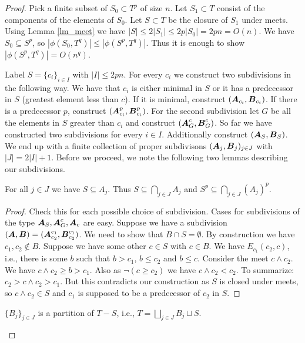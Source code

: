 \begin{proof}
  Pick a finite subset of $S_0 \subset T^p$ of size $n$. Let $S_1 \subset T$ consist of the components of the elements of $S_0$. Let $S \subset T$ be the closure of $S_1$ under meets. Using Lemma \ref{lm_meet} we have $|S| \leq 2|S_1| \leq 2p|S_0| = 2pn = O(n)$. We have $S_0 \subseteq S^p$, so $|\phi(S_0, T^q)| \leq |\phi(S^p, T^q)|$. Thus it is enough to show $|\phi(S^p, T^q)| = O(n^q)$.
  
  Label $S = \{c_i\}_{i \in I}$ with $|I| \leq 2pn$. For every $c_i$ we construct two subdivisions in the following way. We have that $c_i$ is either minimal in $S$ or it has a predecessor in $S$ (greatest element less than $c$). If it is minimal, construct $(\operatorname{\boldsymbol A}_{c_i}, \operatorname{\boldsymbol B}_{c_i})$. If there is a predecessor $p$, construct $(\operatorname{\boldsymbol A}^p_{c_i}, \operatorname{\boldsymbol B}^p_{c_i})$. For the second subdivision let $G$ be all the elements in $S$ greater than $c_i$ and construct $(\operatorname{\boldsymbol A}^c_G, \operatorname{\boldsymbol B}^c_G)$. So far we have constructed two subdivisions for every $i \in I$. Additionally construct $(\operatorname{\boldsymbol A}_S, \operatorname{\boldsymbol B}_S)$. We end up with a finite collection of proper subdivisons $(\operatorname{\boldsymbol A}_j, \operatorname{\boldsymbol B}_j)_{j \in J}$ with $|J| = 2|I| + 1$. Before we proceed, we note the following two lemmas describing our subdivisions.
  
  \begin{Lemma}
    For all $j \in J$ we have $S \subseteq A_j$. Thus $S \subseteq \bigcap_{j \in J} A_j$ and $S^p \subseteq \bigcap_{j \in J} (A_j)^p$. 
  \end{Lemma}
  
  \begin{proof}
    Check this for each possible choice of subdivision. Cases for subdivisions of the type $\operatorname{\boldsymbol A}_S, \operatorname{\boldsymbol A}^c_G, \operatorname{\boldsymbol A}_c$ are easy.
    Suppose we have a subdivision $(\operatorname{\boldsymbol A}, \operatorname{\boldsymbol B}) = (\operatorname{\boldsymbol A}^{c_1}_{c_2}, \operatorname{\boldsymbol B}^{c_1}_{c_2})$.
    We need to show that $B \cap S = \emptyset$.
    By construction we have $c_1, c_2 \notin B$.
    Suppose we have some other $c \in S$ with $c \in B$.
    We have $E_{c_1}(c_2, c)$, i.e., there is some $b$ such that $b > c_1$, $b \leq c_2$ and $b \leq c$.
    Consider the meet $c \wedge c_2$.
    We have $c \wedge c_2 \geq b > c_1$.
    Also as $\neg (c \geq c_2)$ we have $c \wedge c_2 < c_2$.
    To summarize: $c_2 > c \wedge c_2 > c_1$.
    But this contradicts our construction as $S$ is closed under meets,
    so $c \wedge c_2 \in S$ and $c_1$ is supposed to be a predecessor of $c_2$ in $S$.
  \end{proof}
  
  \begin{Lemma}
    $\{B_j\}_{j \in J}$ is a partition of $T - S$, i.e., $T = \bigsqcup_{j \in J} B_j \sqcup S$.
  \end{Lemma}
  

\end{proof}

